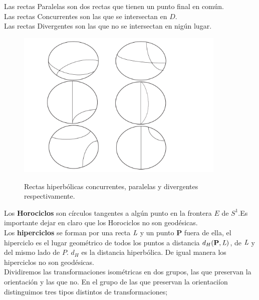 \begin{defn}
Las rectas Paralelas son dos rectas que tienen un punto
final en com\'un.\\
Las rectas Concurrentes son las que se intersectan en $D$.
\\
Las rectas Divergentes son las que no se intersectan en
nig\'un lugar. \\
\end{defn}



\begin{figure}[h]
  \centering
  \includegraphics[width=10cm]{rectas-concurrentes-paralelas-divergentes.pdf}\\
  \caption{Rectas hiperb\'olicas concurrentes, paralelas y divergentes respectivamente.}%
\end{figure}


Los \textbf{Horociclos} son c\'irculos tangentes a alg\'un punto en la
frontera $E$ de $S^{1}$.Es importante dejar en claro que los Horociclos no son geod\'esicas. \\


Los \textbf{hiperciclos} se forman por una recta $\emph{L}$ y un
punto $\textbf{P}$ fuera de ella, el hiperciclo es  el lugar geom\'etrico
de todos los puntos a distancia $d_{H}(\textbf{P},\emph{L})$,  de
$\emph{L}$ y del mismo lado de $P$.  $d_{H}$ es la distancia hiperb\'olica.
 De igual manera los hiperciclos no son geod\'esicas. \\


Dividiremos las transformaciones isom\'etricas en dos grupos, las
que preservan la orientaci\'on y las que no. En el grupo de las que
preservan la orientaci\'ion distinguimos tres tipos distintos de
transformaciones; \\

